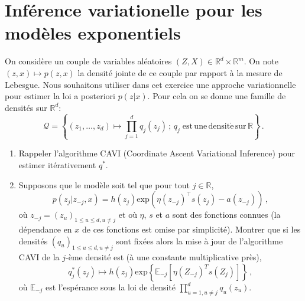 \documentclass[a4paper,10pt,fleqn]{article}
\newcommand{\eqsp}{\,}
\newcommand{\1}{\ensuremath{\mathbbm{1}}}
\begin{document}
\section{Inf\'erence variationelle pour les mod\`eles exponentiels}
On consid\`ere un couple de variables al\'eatoires $(Z,X)\in\mathbb{R}^d\times \mathbb{R}^m$. On note $(z,x) \mapsto p(z,x)$ la densit\'e jointe de ce couple par rapport \`a la mesure de Lebesgue. Nous souhaitons utiliser dans cet exercice une approche variationnelle pour estimer la loi a posteriori $p(z|x)$. Pour cela on se donne une famille de densit\'es sur $\mathbb{R}^d$:
$$
\mathcal{Q} = \left\{(z_1,\ldots,z_d)\mapsto \prod_{j=1}^dq_j(z_j)\eqsp;\eqsp q_j\; \mathrm{est\,une\,densit\acute e\,sur\,\mathbb{R}}\right\}\eqsp.
$$
\begin{enumerate}
\item Rappeler l'algorithme CAVI (Coordinate Ascent Variational Inference) pour estimer it\'erativement $q^*$.
%
%
\item Supposons que le mod\`ele soit tel que pour tout $j\in\mathbb{R}$, 
$$
p(z_j|z_{-j},x) = h(z_j)\mathrm{exp}(\eta(z_{-j})^\top s(z_j) - a(z_{-j}))\eqsp,
$$ 
o\`u $z_{-j} = (z_u)_{1\leqslant u\leqslant d, u \neq j}$ et o\`u $\eta$, $s$ et $a$ sont des fonctions connues (la d\'ependance en $x$ de ces fonctions est omise par simplicit\'e). Montrer que si les densit\'es $(q_u)_{1\leqslant u\leqslant d, u \neq j}$ sont fix\'ees alors la mise \`a jour de l'algorithme CAVI de la $j$-\`eme densit\'e est  (\`a une constante multiplicative pr\`es),
$$
q^*_j(z_j) \mapsto h(z_j) \mathrm{exp}\left\{\mathbb{E}_{-j}[\eta(Z_{-j})^Ts(Z_j)]\right\}\eqsp,
$$
o\`u $\mathbb{E}_{-j}$ est l'esp\'erance sous la loi de densit\'e $\prod_{u=1, u\neq j}^d q_u(z_u)$.


\end{enumerate}
\end{document}
